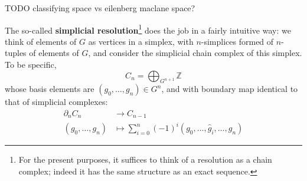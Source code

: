\documentclass{report}
\begin{document}
TODO classifying space vs eilenberg maclane space?

 The so-called \textbf{simplicial 
resolution}\footnote{For the present purposes, it suffices to think of a 
resolution as a chain complex; indeed it has the same structure as an exact 
sequence.} does the job in a fairly intuitive way: we think of elements of $ G $ 
as vertices in a simplex, with $ n $-simplices formed of $ n $-tuples of elements 
of $ G $, and consider the simplicial chain complex of this simplex. To be 
specific, 
\begin{equation*}
	C_n = \bigoplus_{G^{n+1}} \mathbb{Z}
\end{equation*}
whose basis elements are $ (g_0, \dots, g_n)\in G^n $, and with boundary map 
identical to that of simplicial complexes: 
\begin{align*}
	\partial_n C_n &\longrightarrow C_{n-1} \\ 
	(g_0, \dots, g_n) &\longmapsto \sum_{i = 0}^{n}(-1)^i (g_0, \dots, \hat{g}_i, \dots,g_n)
\end{align*}
\end{document}

